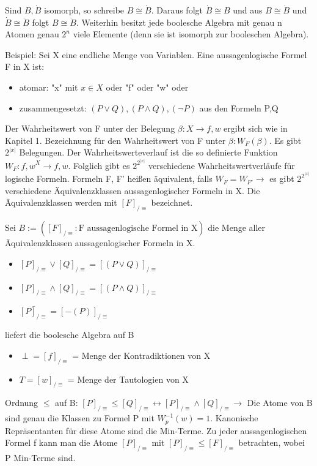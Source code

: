 \documentclass[10pt,landscape]{article}
\begin{document}
\begin{multicols}{3}
Sind $B, \dot{B}$ isomorph, so schreibe $B \cong \dot{B}$. Daraus folgt $\dot{B} \cong B$ und aus $B \cong \dot{B}$ und $\dot{B} \cong \ddot{B}$ folgt $B \cong \ddot{B}$.
Weiterhin besitzt jede boolesche Algebra mit genau n Atomen genau $2^n$ viele Elemente (denn sie ist isomorph zur booleschen Algebra).

Beispiel: Sei X eine endliche Menge von Variablen. Eine aussagenlogische Formel F in X ist:
\begin{itemize}
    \item atomar: "x" mit $x\in X$ oder "f" oder "w" oder
    \item zusammengesetzt: $(P\vee Q), (P \wedge Q), (\neg P)$ aus den Formeln P,Q
\end{itemize}
Der Wahrheitswert von F unter der Belegung $\beta: X\rightarrow {f,w}$ ergibt sich wie in Kapitel 1. Bezeichnung für den Wahrheitswert von F unter $\beta: W_F(\beta)$. Es gibt $2^{|x|}$ Belegungen.
Der Wahrheitswerteverlauf ist die so definierte Funktion $W_F:{f,w}^X\rightarrow{f,w}$. Folglich gibt es $2^ {2^{|x|}}$ verschiedene Wahrheitswertverläufe für logische Formeln. Formeln F, F' heißen äquivalent, falls $W_F=W_{F'} \rightarrow$ es gibt $2^ {2^{|x|}}$ verschiedene Äquivalenzklassen aussagenlogischer Formeln in X. Die Äquivalenzklassen werden mit $[F]_{/\equiv}$ bezeichnet.

Sei $B:=([F]_{/\equiv }: \text{F aussagenlogische Formel in X} )$ die Menge aller Äquivalenzklassen aussagenlogischer Formeln in X.
\begin{itemize}
    \item $[P]_{/\equiv} \vee [Q]_{/\equiv} = [(P\vee Q)]_{/\equiv}$
    \item $[P]_{/\equiv} \wedge [Q]_{/\equiv} = [(P\wedge Q)]_{/\equiv}$
    \item $\bar{[P]_{/\equiv}} = [-(P)]_{/\equiv}$
\end{itemize}
liefert die boolesche Algebra auf B
\begin{itemize}
    \item $\perp = [f]_{/\equiv}$ = Menge der Kontradiktionen von X
    \item $T = [w]_{/\equiv}$ = Menge der Tautologien von X
\end{itemize}

Ordnung $\leq$ auf B: $[P]_{/\equiv} \leq [Q]_{/\equiv} \leftrightarrow [P]_{/\equiv} \wedge [Q]_{/\equiv} \rightarrow$ Die Atome von B sind genau die Klassen zu Formel P mit $W_p^{-1}({w})=1$. Kanonische Repräsentanten für diese Atome sind die Min-Terme.
Zu jeder aussagenlogischen Formel f kann man die Atome $[P]_{/\equiv}$ mit $[P]_{/\equiv} \leq [F]_{/\equiv}$ betrachten, wobei P Min-Terme sind.


\end{multicols}
\end{document}
